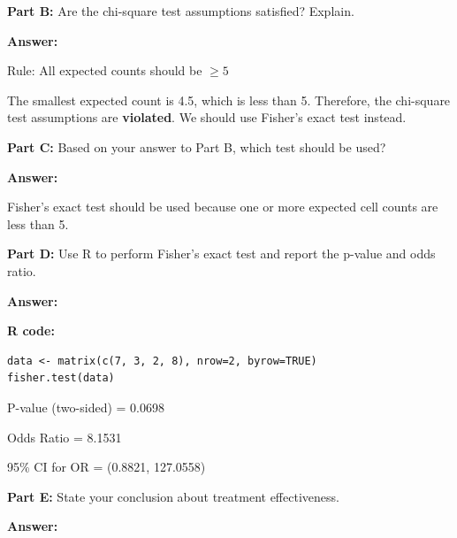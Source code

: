 \documentclass[11pt]{article}
\begin{document}
\vspace{1cm}

\textbf{Part B:} Are the chi-square test assumptions satisfied? Explain.

\vspace{0.3cm}

\textbf{Answer:}

Rule: All expected counts should be $\geq 5$

The smallest expected count is 4.5, which is less than 5. Therefore, the chi-square test assumptions are \textbf{violated}. We should use Fisher's exact test instead.

\vspace{0.5cm}

\textbf{Part C:} Based on your answer to Part B, which test should be used?

\vspace{0.3cm}

\textbf{Answer:}

Fisher's exact test should be used because one or more expected cell counts are less than 5.

\vspace{0.5cm}

\textbf{Part D:} Use R to perform Fisher's exact test and report the p-value and odds ratio.

\vspace{0.3cm}

\textbf{Answer:}

\textbf{R code:}
\begin{verbatim}
data <- matrix(c(7, 3, 2, 8), nrow=2, byrow=TRUE)
fisher.test(data)
\end{verbatim}

\vspace{0.3cm}

P-value (two-sided) = 0.0698

\vspace{0.3cm}

Odds Ratio = 8.1531

\vspace{0.3cm}

95\% CI for OR = (0.8821, 127.0558)

\vspace{0.5cm}

\textbf{Part E:} State your conclusion about treatment effectiveness.

\vspace{0.3cm}

\textbf{Answer:}
\end{document}
